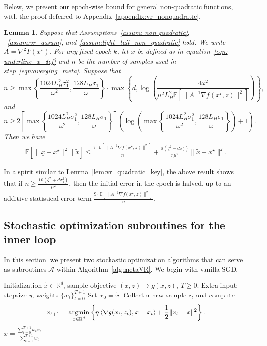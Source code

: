\documentclass[11pt,twoside]{article}
\numberwithin{equation}{section}
\newcommand{\cA}{\mathcal{A}}
\newcommand{\EE}{\mathbb{E}}
\newcommand{\RR}{\mathbb{R}}
\newcommand{\ceil}[1]{\left \lceil #1 \right \rceil }
\newcommand{\1}{\mathbf{1}}
\newcommand{\argmin}{\operatornamewithlimits{argmin}}
\newcommand{\dotp}[1]{\left\langle #1\right\rangle}
\newtheorem{lemma}[theorem]{Lemma}
\theoremstyle{remark}
\theoremstyle{plain}
\newcommand{\liph}{L_H}
\newcommand{\lmin}{\omega}
\begin{document}
Below, we present our epoch-wise bound for general non-quadratic functions, with the proof deferred to Appendix~\ref{appendix:vr_nonquadratic}. 
\begin{lemma}\label{lem:vr_key_non_qud}
Suppose that Assumptions~\ref{assum: non-quadratic}, ~\ref{assum:vr_assum}, and~\ref{assum:light_tail_non_quadratic} hold. We write $A = \nabla^2 F(x^\star)$. For any fixed epoch $k$, let $\underline{x}$ be defined as in equation~\eqref{eqn: underline_x_def} and $n$ be the number of samples used in step~\eqref{eqn:averging_meta}. Suppose that
$$n \ge  \max \left\{ \frac{1024 \liph^2  \sigma_1^2}{\lmin^2}, \frac{128\liph \sigma_1}{\lmin}\right\} \cdot \max\left\{ d, \log \left(\frac{4 \lmin^2}{\mu^2 \liph^2 \EE[\|A^{-1} \nabla f(x^\star,z)\|^2]}\right) \right\},$$
and 
$$
n \ge   2\ceil{\max \left\{ \frac{1024 \liph^2  \sigma_1^2}{\lmin^2}, \frac{128\liph \sigma_1}{\lmin}\right\}} \left( \log \left( \max \left\{ \frac{1024 \liph^2  \sigma_1^2}{\lmin^2}, \frac{128\liph \sigma_1}{\lmin}\right\}\right) +1\right).
$$
Then we have
\begin{align*}
	\EE[\|\underline{x} - x^\star\|^2 \mid \tilde x] \le \frac{9 \cdot \EE[\|A^{-1} \nabla f(x^\star,z)\|^2]}{n} + \frac{8(\zeta^2  + d\sigma_2^2)}{n \mu^2} \|\tilde x - x^\star\|^2.
\end{align*}
\end{lemma}
In a spirit similar to Lemma~\ref{lem:vr_quadratic_key}, the above result shows that if $n \ge \frac{16(\zeta^2 + d \sigma_2^2)}{\mu^2}$, then the initial error in the epoch is halved, up to an additive statistical error term $\frac{9 \cdot \EE[\|A^{-1} \nabla f(x^\star,z)\|^2]}{n}$.


\subsection{Stochastic optimization subroutines for the inner loop}\label{sec:stochastic_opt_subroutine}
In this section, we present two stochastic optimization algorithms that can serve as subroutines $\cA$ within Algorithm~\ref{alg:metaVR}. 
We begin with vanilla SGD.
\begin{algorithm}
\caption{SGD($\tilde x, g, T$)}
\label{alg:SGD}
\begin{algorithmic}[1]
	   Initialization $\tilde x \in \RR^d$, sample objective $(x,z) \rightarrow g(x,z)$, $ T\ge 0$.
	\State Extra input: stepsize $\eta$,  weights $\{w_t\}_{t=0}^{T+1}$   %
	\State Set $x_0 = \tilde x$. 
	\State Collect a new sample $z_t$ and compute
	\begin{equation}\label{eqn:VRupdate_innerloop}
		x_{t+1} = \argmin_{x \in \RR^d}\left\{ \eta  \dotp{\nabla g(x_t,z_t), x - x_t} +  \frac{1}{2}\|x_t - x\|^2\right\}.
	\end{equation}
	\EndFor
	\State \Return  $\widehat x = \frac{\sum_{t=0}^{T+1} w_t x_t}{\sum_{t=0}^{T+1} w_t}$
\end{algorithmic}
\end{algorithm}
\end{document}
